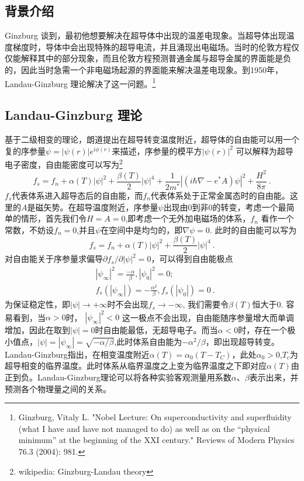 
\begin{issues}
\issueTODO
\end{issues}

\subsection{背景介绍}
Ginzburg 谈到，最初他想要解决在超导体中出现的温差电现象。当超导体出现温度梯度时，导体中会出现特殊的超导电流，并且涌现出电磁场。当时的伦敦方程仅仅能解释其中的部分现象，而且伦敦方程预测普通金属与超导金属的界面能是负的，因此当时急需一个非电磁场起源的界面能来解决温差电现象。到1950年，Landau-Ginzburg 理论解决了这一问题。\footnote{Ginzburg, Vitaly L. "Nobel Lecture: On superconductivity and superfluidity (what I have and have not managed to do) as well as on the “physical minimum” at the beginning of the XXI century." Reviews of Modern Physics 76.3 (2004): 981.}
\subsection{Landau-Ginzburg 理论}
基于二级相变的理论，朗道提出在超导转变温度附近，超导体的自由能可以用一个复的序参量$\psi = |\psi(r)|e^{i\phi(r)}$来描述，序参量的模平方$|\psi(r)|^2$ 可以解释为超导电子密度，自由能密度可以写为\footnote{wikipedia: Ginzburg-Landau theory}
\begin{equation}
f_s = f_n + \alpha(T) |\psi|^2 + \frac{\beta(T)}{2} |\psi|^4 + \frac{1}{2m^*} \left| \left(i\hbar \nabla - e^* A \right)\psi \right|^2 + \frac{H^2}{8\pi} \label{eq_gl_1}~.
\end{equation}
$f_s$代表体系进入超导态后的自由能，而$f_n$代表体系处于正常金属态时的自由能。这里的$A$是磁矢势。在超导温度附近，序参量$\psi$出现由0到非0的转变，考虑一个最简单的情形，首先我们令$H=A = 0$,即考虑一个无外加电磁场的体系，$f_n$ 看作一个常数，不妨设$f_n=0$,并且$\psi$在空间中是均匀的，即$\nabla \psi = 0$. 此时的自由能可以写为
\begin{equation}
f_s = f_n + \alpha(T) |\psi|^2 + \frac{\beta(T)}{2} |\psi|^4 ~.
\end{equation}
对自由能关于序参量求偏导$\partial f_s /\partial |\psi|^2 = 0$，可以得到自由能极点
\begin{align}
&|\psi_{\infty}|^2 = \frac{-\alpha}{\beta},|\psi_0|^2 = 0;\\
&f_s(|\psi_{\infty}|) = -\frac{\alpha^2}{\beta}, f_s(|\psi_0|) = 0 ~.
\end{align}
为保证稳定性，即$|\psi|\rightarrow +\infty$时不会出现$f_s \rightarrow -\infty$, 我们需要令$\beta(T)$恒大于0. 容易看到，当$\alpha>0$时， $|\psi_\infty|^2 <0$ 这一极点不会出现，自由能随序参量增大而单调增加，因此在取到$|\psi|=0$时自由能最低，无超导电子。而当$\alpha<0$时，存在一个极小值点，$|\psi| = |\psi_{\infty}| = \sqrt{-\alpha/\beta}$,此时体系自由能为$-\alpha^2/\beta$，即出现超导转变。Landau-Ginzburg指出，在相变温度附近$\alpha(T) = \alpha_0 (T - T_C)$，此处$\alpha_0 > 0$,$T_c$为超导相变的临界温度。此时体系从临界温度之上变为临界温度之下即对应$\alpha(T)$由正到负。Landau-Ginzburg理论可以将各种实验客观测量用系数$\alpha$、$\beta$表示出来，并预测各个物理量之间的关系。
